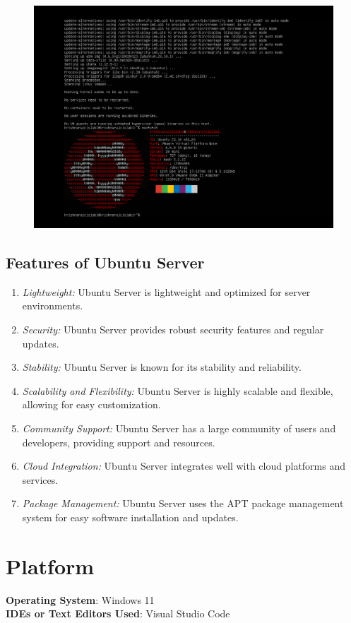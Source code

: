 \documentclass[11pt]{article}
\begin{document}
\begin{figure}[H]
    \centering
    \includegraphics[width=.95\textwidth]{screenshots/20.png}
    \caption{}
\end{figure}

\subsection{Features of Ubuntu Server}

\begin{enumerate}
    \item \textit{Lightweight:} Ubuntu Server is lightweight and optimized for server environments.
    \item \textit{Security:} Ubuntu Server provides robust security features and regular updates.
    \item \textit{Stability:} Ubuntu Server is known for its stability and reliability.
    \item \textit{Scalability and Flexibility:} Ubuntu Server is highly scalable and flexible, allowing for easy customization.
    \item \textit{Community Support:} Ubuntu Server has a large community of users and developers, providing support and resources.
    \item \textit{Cloud Integration:} Ubuntu Server integrates well with cloud platforms and services.
    \item \textit{Package Management:} Ubuntu Server uses the APT package management system for easy software installation and updates.
\end{enumerate}

\section{Platform}
\textbf{Operating System}: Windows 11 \\
\textbf{IDEs or Text Editors Used}: Visual Studio Code\\
\end{document}
